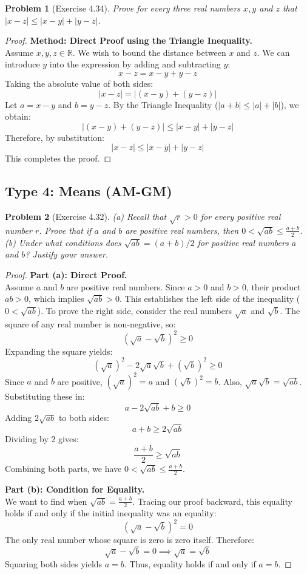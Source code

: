 \documentclass[11pt]{article}
\newtheorem{problem}{Problem}
\newcommand{\R}{\mathbb{R}}
\newcommand{\abs}[1]{\left|#1\right|}
\begin{document}
\begin{problem}[Exercise 4.34]
Prove for every three real numbers $x, y$ and $z$ that $\abs{x - z} \le \abs{x - y} + \abs{y - z}$.
\end{problem}
\begin{proof}
\textbf{Method: Direct Proof using the Triangle Inequality.} \\
Assume $x, y, z \in \R$. We wish to bound the distance between $x$ and $z$. We can introduce $y$ into the expression by adding and subtracting $y$:
\[ x - z = x - y + y - z \]
Taking the absolute value of both sides:
\[ \abs{x - z} = \abs{(x - y) + (y - z)} \]
Let $a = x - y$ and $b = y - z$. By the Triangle Inequality ($\abs{a + b} \le \abs{a} + \abs{b}$), we obtain:
\[ \abs{(x - y) + (y - z)} \le \abs{x - y} + \abs{y - z} \]
Therefore, by substitution:
\[ \abs{x - z} \le \abs{x - y} + \abs{y - z} \]
This completes the proof.
\end{proof}

\subsection{Type 4: Means (AM-GM)}

\begin{problem}[Exercise 4.32]
(a) Recall that $\sqrt{r} > 0$ for every positive real number $r$. Prove that if $a$ and $b$ are positive real numbers, then $0 < \sqrt{ab} \le \frac{a+b}{2}$. \\
(b) Under what conditions does $\sqrt{ab} = (a+b)/2$ for positive real numbers $a$ and $b$? Justify your answer.
\end{problem}
\begin{proof}
\textbf{Part (a): Direct Proof.} \\
Assume $a$ and $b$ are positive real numbers. Since $a > 0$ and $b > 0$, their product $ab > 0$, which implies $\sqrt{ab} > 0$. This establishes the left side of the inequality ($0 < \sqrt{ab}$).
To prove the right side, consider the real numbers $\sqrt{a}$ and $\sqrt{b}$. The square of any real number is non-negative, so:
\[ (\sqrt{a} - \sqrt{b})^2 \ge 0 \]
Expanding the square yields:
\[ (\sqrt{a})^2 - 2\sqrt{a}\sqrt{b} + (\sqrt{b})^2 \ge 0 \]
Since $a$ and $b$ are positive, $(\sqrt{a})^2 = a$ and $(\sqrt{b})^2 = b$. Also, $\sqrt{a}\sqrt{b} = \sqrt{ab}$. Substituting these in:
\[ a - 2\sqrt{ab} + b \ge 0 \]
Adding $2\sqrt{ab}$ to both sides:
\[ a + b \ge 2\sqrt{ab} \]
Dividing by 2 gives:
\[ \frac{a + b}{2} \ge \sqrt{ab} \]
Combining both parts, we have $0 < \sqrt{ab} \le \frac{a+b}{2}$.

\textbf{Part (b): Condition for Equality.} \\
We want to find when $\sqrt{ab} = \frac{a+b}{2}$. Tracing our proof backward, this equality holds if and only if the initial inequality was an equality:
\[ (\sqrt{a} - \sqrt{b})^2 = 0 \]
The only real number whose square is zero is zero itself. Therefore:
\[ \sqrt{a} - \sqrt{b} = 0 \implies \sqrt{a} = \sqrt{b} \]
Squaring both sides yields $a = b$. Thus, equality holds if and only if $a = b$.
\end{proof}
\end{document}
